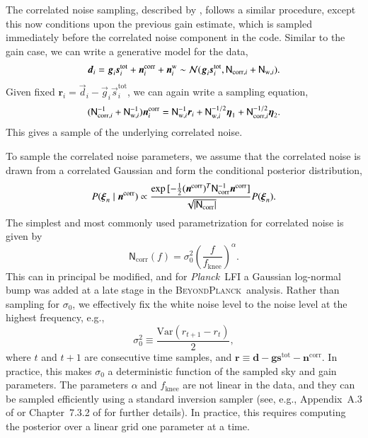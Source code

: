 \documentclass[twocolumn]{../../common/aa}
\def\Planck{\emph{Planck}}
\newcommand{\dv}[0]{\vec{d}}
\newcommand{\n}[0]{\vec{n}}
\newcommand{\s}[0]{\vec{s}}
\newcommand{\g}[0]{\vec{g}}
\newcommand{\N}[0]{\tens{N}}
\newcommand{\bp}{\textsc{BeyondPlanck}}
\begin{document}
The correlated noise sampling, described by \citet{bp06}, follows a similar procedure, except this now conditions upon the previous gain estimate, which is sampled immediately before the correlated noise component in the code. Similar to the gain case, we can write a generative model for the data,
\begin{equation}
	\dv_i=\g_i\s_i^\mathrm{tot}+\n_i^\mathrm{corr}+\n^\mathrm{w}_i
	\sim\mathcal N(\g_i\s_i^\mathrm{tot},\N_{\mathrm{corr},i}+\N_{\mathrm{w},i}).
\end{equation}
Given fixed $\boldsymbol r_i=\dv_i-\g_i\s_i^\mathrm{tot}$, we can again write a sampling equation, 
\begin{equation}
	\label{eq:ncorr_gauss_samp}
	(\N_{\mathrm{corr},i}^{-1}+\N_{\mathrm{w},i}^{-1})
	\n^\mathrm{corr}_i
	=\N^{-1}_{\mathrm{w},i}\boldsymbol r_i
	+\N^{-1/2}_{\mathrm{w},i}\boldsymbol\eta_1
	+\N^{-1/2}_{\mathrm{corr},i}\boldsymbol\eta_2.
\end{equation}
This gives a sample of the underlying correlated noise. %

To sample the correlated noise parameters, we assume that the correlated noise is drawn from a correlated Gaussian and form the conditional posterior distribution,
\begin{equation}
	P(\boldsymbol\xi_n\mid\n^\mathrm{corr})\propto\frac{\exp{[-\frac12(\n^\mathrm{corr})^T\N_\mathrm{corr}^{-1}\n^\mathrm{corr}]}}
	{\sqrt{|\N_\mathrm{corr}|}}P(\boldsymbol\xi_n).
\end{equation}
The simplest and most commonly used parametrization for correlated noise is given by
\begin{equation}
	\mathsf N_\mathrm{corr}(f)=\sigma_0^2\left(\frac f{f_\mathrm{knee}}\right)^\alpha.
\end{equation}
This can in principal be modified, and for \Planck\ LFI a Gaussian log-normal bump was added at a late stage in the \bp\ analysis. Rather than sampling for $\sigma_0$, we effectively fix the white noise level to the noise level at the highest frequency, e.g.,
\begin{equation}
	\sigma_0^2\equiv\frac{\mathrm{Var}(r_{t+1}-r_t)}2,
\end{equation}
where $t$ and $t+1$ are consecutive time samples, and ${\boldsymbol r\equiv\boldsymbol d-\boldsymbol g\boldsymbol s^\mathrm{tot}
-\boldsymbol n^\mathrm{corr}}$. In practice, this makes $\sigma_0$ a deterministic function of the sampled sky and gain parameters. The parameters $\alpha$ and $f_\mathrm{knee}$ are not linear in the data, and they can be sampled efficiently using a standard inversion sampler (see, e.g., Appendix~A.3 of \citealt{bp01} or Chapter~7.3.2 of \citealt{numerical_recipes} for further details). In practice, this requires computing the posterior over a linear grid one parameter at a time.
\end{document}
